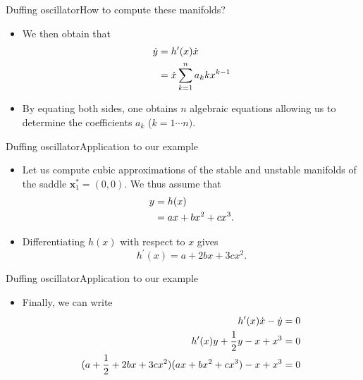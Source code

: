 \documentclass[usenames,dvipsnames,svgnames,10pt,aspectratio=169]{beamer}
\begin{document}
\begin{frame}[t, c]{Duffing oscillator}{How to compute these manifolds?}
	\begin{itemize}
		\item We then obtain that
		\begin{equation}
			\begin{aligned}
				\dot{y} & = h^{\prime}(x) \dot{x} \\
								& = \dot{x} \sum \limits_{k=1}^n a_k k x^{k-1}
			\end{aligned}
			\notag
		\end{equation}

		\bigskip

		\item By equating both sides, one obtains $n$ algebraic equations allowing us to determine the coefficients $a_k$ ($k= 1 \cdots n)$.
	\end{itemize}

	\vspace{1cm}
\end{frame}

\begin{frame}[t, c]{Duffing oscillator}{Application to our example}
	\begin{itemize}
		\item Let us compute cubic approximations of the stable and unstable manifolds of the saddle ${\bm x}^*_1 = (0, 0)$. We thus assume that
		\begin{equation}
			\begin{aligned}
				y & = h(x) \\
				  & = a x + b x^2 + c x^3. \\
			\end{aligned}
			\notag
		\end{equation}

		\bigskip

		\item Differentiating $h(x)$ with respect to $x$ gives
		$$h^{\prime}(x) = a + 2 b x + 3 c x^2.$$
	\end{itemize}

	\vspace{1cm}
\end{frame}

\begin{frame}[t, c]{Duffing oscillator}{Application to our example}
	\begin{itemize}
		\item Finally, we can write
		\begin{equation}
			\begin{aligned}
				h^{\prime}(x) \dot{x} - \dot{y} & = 0 \\
				h^{\prime}(x) y + \displaystyle \frac{1}{2}y - x + x^3 & = 0 \\
				(a + \displaystyle \frac{1}{2} + 2 b x + 3 c x^2) (a x + b x^2 + c x^3) - x + x^3 & = 0
			\end{aligned}
			\notag
		\end{equation}
	\end{itemize}

	\vspace{1cm}
\end{frame}
\end{document}
